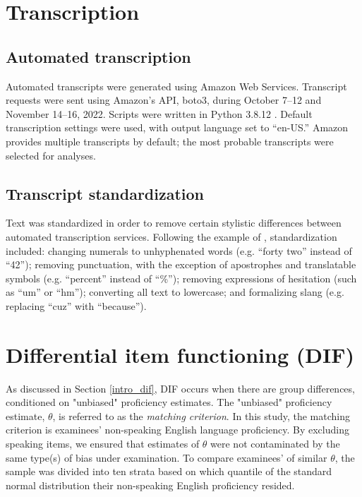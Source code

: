 \documentclass [PhD] {uclathes}
\begin{document}
\section{Transcription}

\subsection{Automated transcription}
\label{meth_auto_transcribe}

Automated transcripts were generated using Amazon Web Services. Transcript requests were sent using Amazon’s API, boto3, during October 7–12 and November 14–16, 2022. Scripts were written in Python 3.8.12 \citep{python2022}. Default transcription settings were used, with output language set to “en-US.” Amazon provides multiple transcripts by default; the most probable transcripts were selected for analyses.

\subsection{Transcript standardization}
\label{sec:meth_text_standardization}

Text was standardized in order to remove certain stylistic differences between automated transcription services. Following the example of \cite{koenecke2020}, standardization included: changing numerals to unhyphenated words (e.g. “forty two” instead of “42”); removing punctuation, with the exception of apostrophes and translatable symbols (e.g. “percent” instead of “\%”); removing expressions of hesitation (such as “um” or “hm”); converting all text to lowercase; and formalizing slang (e.g. replacing “cuz” with “because”).

\section{Differential item functioning (DIF)}
\label{meth_dif}

As discussed in Section \ref{intro_dif}, DIF occurs when there are group differences, conditioned on "unbiased" proficiency estimates. The "unbiased" proficiency estimate, $\theta$, is referred to as the \emph{matching criterion}. In this study, the matching criterion is examinees' non-speaking English language proficiency. By excluding speaking items, we ensured that estimates of $\theta$ were not contaminated by the same type(s) of bias under examination. To compare examinees' of similar $\theta$, the sample was divided into ten strata based on which quantile of the standard normal distribution their non-speaking English proficiency resided.
\end{document}
